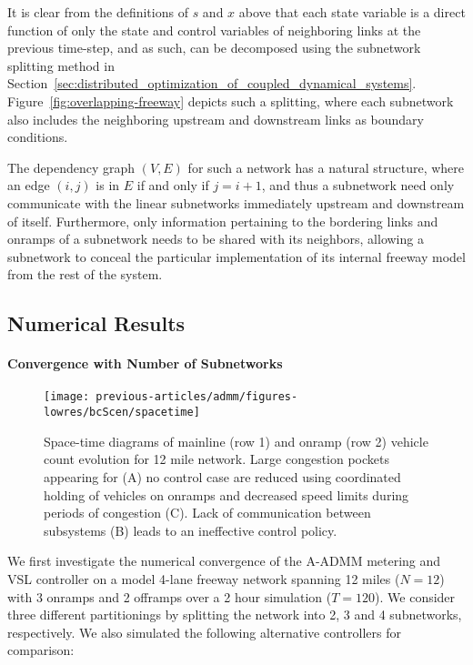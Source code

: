 It is clear from the definitions of $s$ and $x$ above that each state variable is a direct function of only the state and control variables of neighboring links at the previous time-step, and as such, can be decomposed using the subnetwork splitting method in Section~\ref{sec:distributed_optimization_of_coupled_dynamical_systems}. Figure~\ref{fig:overlapping-freeway} depicts such a splitting, where each subnetwork also includes the neighboring upstream and downstream links as boundary conditions.

The dependency graph $\left(V,E\right)$ for such a network has a natural structure, where an edge $(i,j)$ is in $E$ if and only if $j=i+1$, and thus a subnetwork need only communicate with the linear subnetworks immediately upstream and downstream of itself. Furthermore, only information pertaining to the bordering links and onramps of a subnetwork needs to be shared with its neighbors, allowing a subnetwork to conceal the particular implementation of its internal freeway model from the rest of the system.


\subsection{Numerical Results}
\label{sec:numerical_results-admm}

\paragraph{Convergence with Number of Subnetworks}

\begin{figure}[t]
  \centering
  \texttt{[image: previous-articles/admm/figures-lowres/bcScen/spacetime]}
  \caption[Space-time diagrams of mainline and onramp vehicle count evolution for 12 mile network depicting large congestion pockets being reduced using coordinated holding of vehicles on onramps and decreased speed limits during periods of congestion.]{Space-time diagrams of mainline (row 1) and onramp (row 2) vehicle count evolution for 12 mile network. Large congestion pockets appearing for (A) no control case are reduced using coordinated holding of vehicles on onramps and decreased speed limits during periods of congestion (C). Lack of communication between subsystems (B) leads to an ineffective control policy.}
  \label{fig:spacetime}
\end{figure}

We first investigate the numerical convergence of the A-ADMM metering and VSL controller on a model 4-lane freeway network spanning 12 miles ($N=12$) with 3 onramps and 2 offramps over a 2 hour simulation ($T=120$). We consider three different partitionings by splitting the network into 2, 3 and 4 subnetworks, respectively. We also simulated the following alternative controllers for comparison:

